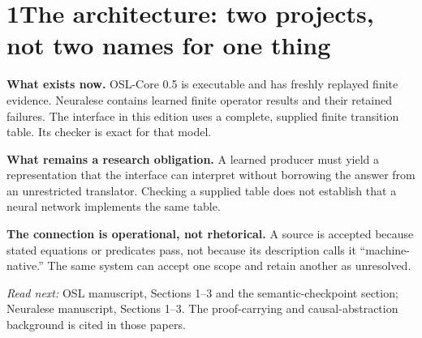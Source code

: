 \documentclass[11pt]{article}
\begin{document}

\section*{1\quad The architecture: two projects, not two names for one thing}
\begin{center}
\end{center}
\textbf{What exists now.} OSL-Core 0.5 is executable and has freshly replayed finite evidence. Neuralese contains learned finite operator results and their retained failures. The interface in this edition uses a complete, supplied finite transition table. Its checker is exact for that model.

\textbf{What remains a research obligation.} A learned producer must yield a representation that the interface can interpret without borrowing the answer from an unrestricted translator. Checking a supplied table does not establish that a neural network implements the same table.

\begin{scopebox}
\textbf{The connection is operational, not rhetorical.} A source is accepted because stated equations or predicates pass, not because its description calls it ``machine-native.'' The same system can accept one scope and retain another as unresolved.
\end{scopebox}
\textit{Read next:} OSL manuscript, Sections 1--3 and the semantic-checkpoint section; Neuralese manuscript, Sections 1--3. The proof-carrying and causal-abstraction background is cited in those papers.
\clearpage
\end{document}
